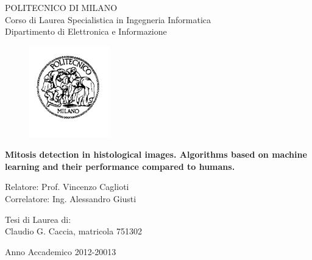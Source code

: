 \thispagestyle{empty}
\vspace*{-1.5cm}
\bfseries{
	\begin{center}
		\large
		POLITECNICO DI MILANO\\
		\normalsize
		Corso di Laurea Specialistica in Ingegneria Informatica\\
		Dipartimento di Elettronica e Informazione\\
		\begin{figure}[htbp]
			\begin{center}
				\includegraphics[width=3.5cm]{./images/logopm}
			\end{center}
		\end{figure}
		
		\vspace*{0.5cm} \LARGE
		
		\textbf{Mitosis detection in histological images.  Algorithms based on machine learning and their performance compared to humans.}\\
		
		\vspace*{.5truecm} \large
		
	\end{center}
	
	\vspace*{2.0cm} \large
	
	\begin{flushleft}
		Relatore: Prof. Vincenzo Caglioti \\
		Correlatore: Ing. Alessandro Giusti
	\end{flushleft}
	
	\vspace*{1.25cm}
	
	\begin{flushright}
		Tesi di Laurea di:\\ Claudio G. Caccia, matricola 751302 \\
	\end{flushright}
	
	\vspace*{2.0cm}
	
	\begin{center}
		Anno Accademico 2012-20013
	\end{center} \clearpage
}
